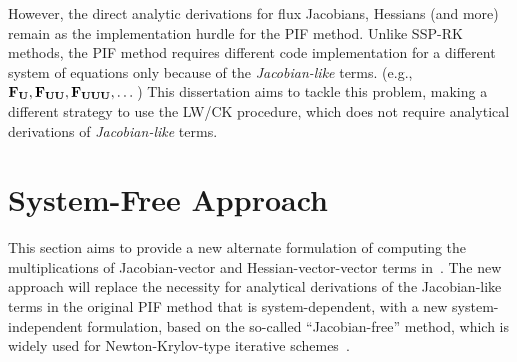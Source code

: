 However, the direct analytic derivations for flux Jacobians, Hessians (and more)
remain as the implementation hurdle for the PIF method.
Unlike SSP-RK methods, the PIF method requires different code implementation
for a different system of equations only because of the \textit{Jacobian-like} terms. (e.g., \( \mathbf{F}_{\mathbf{U}}, \mathbf{F}_{\mathbf{U}\mathbf{U}}, \mathbf{F}_{\mathbf{U}\mathbf{U}\mathbf{U}}, \dots \))
This dissertation aims to tackle this problem,
making a different strategy to use the LW/CK procedure,
which does not require analytical derivations of \textit{Jacobian-like} terms.



\section{System-Free Approach}\label{sec:original_sf}

This section aims to provide a new alternate formulation of computing
the multiplications of Jacobian-vector and Hessian-vector-vector terms in~.
The new approach will replace the necessity for analytical derivations
of the Jacobian-like terms in the original PIF method that is system-dependent,
with a new system-independent formulation, based on the so-called ``Jacobian-free'' method,
which is widely used for Newton-Krylov-type
iterative schemes~\cite{gear1983iterative,brown1990hybrid,knoll2004jacobian,knoll2011application}.

